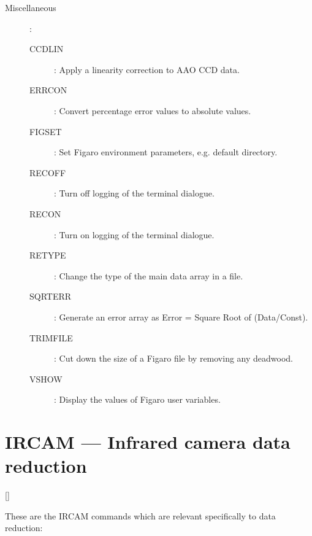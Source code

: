\begin {description}
\begin{description}
\item [Miscellaneous]\hspace{-1.5mm}:
\begin{description}
\item [CCDLIN]: Apply a linearity correction to AAO CCD data.
\item [ERRCON]: Convert percentage error values to absolute values.
\item [FIGSET]: Set Figaro environment parameters, e.g. default directory.
\item [RECOFF]: Turn off logging of the terminal dialogue.
\item [RECON]: Turn on logging of the terminal dialogue.
\item [RETYPE]: Change the type of the main data array in a file.
\item [SQRTERR]: Generate an error array as Error = Square Root of (Data/Const).
\item [TRIMFILE]: Cut down the size of a Figaro file by removing any deadwood.
\item [VSHOW]: Display the values of Figaro user variables.
\end{description}
\end{description}
\end{description}

\newpage

\section{IRCAM --- Infrared camera data reduction}

\vspace{-10mm}

\hfill []

\vspace{2mm}

These are the IRCAM commands which are relevant specifically to data reduction:

